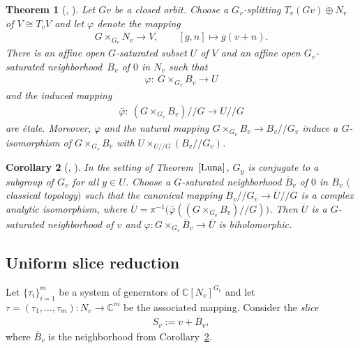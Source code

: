 \documentclass[pdftex]{sigma}
\numberwithin{equation}{section}
\newtheorem{Theorem}{Theorem}[section]
\newtheorem{Corollary}[Theorem]{Corollary}
\def\ta{\tau}
\def\vh{\varphi}
\def\C{\mathbb{C}}
\def\ol{\overline}
\def\cq{{/\!\!/}}
\begin{document}
\begin{Theorem}[{\cite{Luna73}, \cite[Theorem 5.3]{Schwarz80}}] \label{Luna}
Let $Gv$ be a closed orbit.
Choose a $G_v$-splitting \mbox{$T_v (Gv) \oplus N_v$} of $V \cong T_v V$ and let $\vh$ denote the mapping
\begin{gather*}
 G \times_{G_v} N_v \to V, \qquad [g,n] \mapsto g(v+n).
\end{gather*}
There is an affine open $G$-saturated subset $U$ of $V$ and an affine open $G_v$-saturated neighborhood~$B_v$ of $0$ in $N_v$
such that
\begin{gather*}
 \vh \colon\ G \times_{G_v} B_v \to U
\end{gather*}
and the induced mapping
\begin{gather*}
 \bar \vh \colon\ (G \times_{G_v} B_v)\cq G \to U\cq G
\end{gather*}
are \'etale.
Moreover, $\vh$ and the natural mapping $G \times_{G_v} B_v \to B_v \cq G_v$
induce a $G$-isomorphism of $G \times_{G_v} B_v$ with $U \times_{U\cq G} (B_v\cq G_v)$.
\end{Theorem}

\begin{Corollary}[{\cite{Luna73}, \cite[Corollary 5.4]{Schwarz80}}] \label{HST}
 In the setting of Theorem~$\ref{Luna}$,
 $G_y$ is conjugate to a subgroup of $G_v$ for all $y \in U$.	
 Choose a $G$-saturated neighborhood $\ol B_v$ of $0$ in $B_v$ $($classical topology$)$
 such that the canonical mapping $\ol B_v \cq G_v \to \ol U \cq G$ is a complex analytic isomorphism,
 where $\ol U = \pi^{-1}\big(\bar \vh((G \times_{G_v} B_v)\cq G)\big)$.
 Then $\ol U$ is a $G$-saturated neighborhood of $v$ and $\vh \colon G \times_{G_v} \ol B_v \to \ol U$
 is biholomorphic.
\end{Corollary}

\subsection{Uniform slice reduction} \label{ssec:red}

Let $\{\ta_i\}_{i=1}^m$ be a system of generators of $\C[N_v]^{G_v}$ and
let $\ta = (\ta_1,\dots,\ta_m) \colon N_v \rightarrow \mathbb{C}^m$ be the associated mapping.
Consider the \emph{slice}
\begin{gather*}%
 S_v := v+\ol B_v,
\end{gather*}
where $\ol B_v$ is the neighborhood from Corollary~\ref{HST}.
\end{document}
